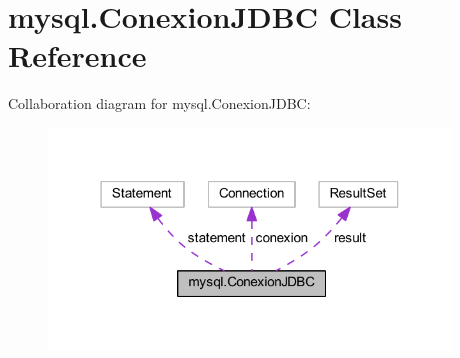 \hypertarget{classmysql_1_1_conexion_j_d_b_c}{}\section{mysql.\+Conexion\+J\+D\+BC Class Reference}
\label{classmysql_1_1_conexion_j_d_b_c}


Collaboration diagram for mysql.\+Conexion\+J\+D\+BC\+:\nopagebreak
\begin{figure}[H]
\begin{center}
\leavevmode
\includegraphics[width=303pt]{classmysql_1_1_conexion_j_d_b_c__coll__graph}
\end{center}
\end{figure}
